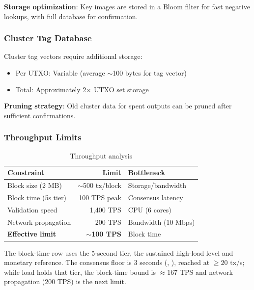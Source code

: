 \textbf{Storage optimization}: Key images are stored in a Bloom filter for
fast negative lookups, with full database for confirmation.

\subsubsection{Cluster Tag Database}

Cluster tag vectors require additional storage:

\begin{itemize}
  \item Per UTXO: Variable (average $\sim$100 bytes for tag vector)
  \item Total: Approximately 2$\times$ UTXO set storage
\end{itemize}

\textbf{Pruning strategy}: Old cluster data for spent outputs can be pruned
after sufficient confirmations.

\subsubsection{Throughput Limits}

\begin{table}[h]
\centering
\caption{Throughput analysis}
\label{tab:throughput-analysis}
\begin{tabular}{@{}lrl@{}}
\toprule
\textbf{Constraint} & \textbf{Limit} & \textbf{Bottleneck} \\
\midrule
Block size (2 MB) & $\sim$500 tx/block & Storage/bandwidth \\
Block time (5s tier) & 100 TPS peak & Consensus latency \\
Validation speed & 1,400 TPS & CPU (6 cores) \\
Network propagation & 200 TPS & Bandwidth (10 Mbps) \\
\midrule
\textbf{Effective limit} & \textbf{$\sim$100 TPS} & Block time \\
\bottomrule
\end{tabular}
\end{table}

The block-time row uses the 5-second tier, the sustained high-load level and
monetary reference. The consensus floor is 3 seconds
(,
), reached at $\geq$20 tx/s; while
load holds that tier, the block-time bound is $\approx$167 TPS and network
propagation (200 TPS) is the next limit.

